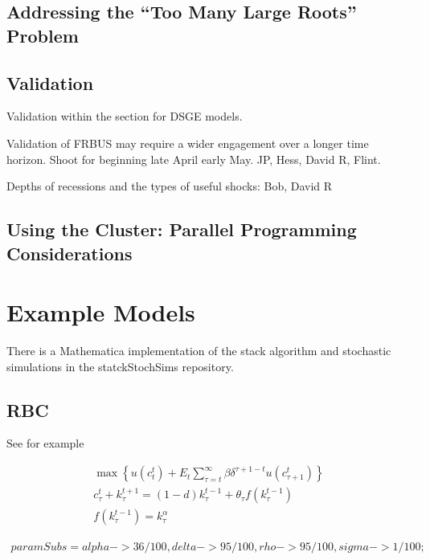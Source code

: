 \documentclass[12pt]{article}
\begin{document}
\subsection{Addressing the ``Too Many Large Roots'' Problem}
\label{sec:addressing-too-many}

\subsection{Validation}
\label{sec:validation}

Validation within the section for DSGE models.

Validation of FRBUS may require a wider engagement over a longer time horizon. 
Shoot for beginning late April early May.  JP, Hess, David R, Flint.

Depths of recessions and the types of useful shocks:  Bob, David R

\subsection{Using the Cluster:  Parallel Programming Considerations}
\label{sec:using-clust-parall}





\section{Example Models}
\label{sec:example-models}

There is a Mathematica implementation of the stack algorithm
 and stochastic simulations in the statckStochSims repository.  

\newpage

\subsection{RBC}
\label{sec:rbc}


  See for example\cite{Maliar2005}

\begin{gather*}
   \max\left \{  u(c_t^t) + E_t \sum_{\tau=t}^\infty \beta \delta^{\tau+1-t}u(c_{\tau+1}^t)\right \}\\
c_\tau^t + k_\tau^{t+1}=(1-d)k_\tau^{t-1} + \theta_\tau f(k_\tau^{t-1})\\
f(k_\tau^{t-1})= k_\tau^\alpha
 \end{gather*}

 \begin{gather*}
   paramSubs={
alpha->36/100,
delta->95/100,
rho->95/100,
sigma->1/100
} ;
 \end{gather*}
\end{document}
